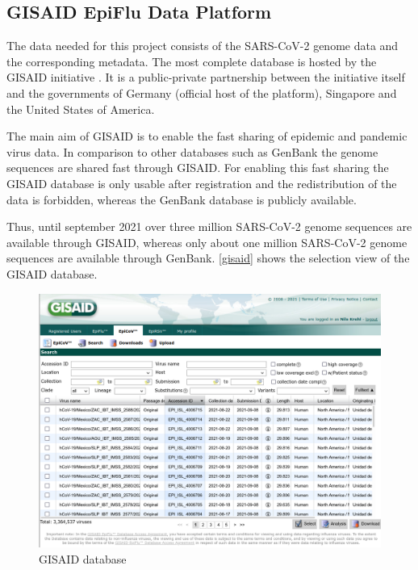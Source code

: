 \subsection{GISAID EpiFlu Data Platform} \label{fundamentalsC}

The data needed for this project consists of the \ac{SARS-CoV-2} genome data and the corresponding metadata. The most complete database is hosted by the \ac{GISAID} initiative \cite{Gisaid2021}. It is a public-private partnership between the initiative itself and the governments of Germany (official host of the platform), Singapore and the United States of America. \cite{gisaideditorGISAID2021}

The main aim of \ac{GISAID} is to enable the fast sharing of epidemic and pandemic virus data. In comparison to other databases such as GenBank the genome sequences are shared fast through \ac{GISAID}. For enabling this fast sharing the \ac{GISAID} database is only usable after registration and the redistribution of the data is forbidden, whereas the GenBank database is publicly available. \cite{shuGISAIDGlobalInitiative2017}

Thus, until september 2021 over three million \ac{SARS-CoV-2} genome sequences are available through \ac{GISAID}, whereas only about one million \ac{SARS-CoV-2} genome sequences are available through GenBank. \autoref{gisaid} shows the selection view of the \ac{GISAID} database. \cite{gisaideditorGISAID2021, nationallibraryofmedicinencbieditorNCBISARSCoV2Resources}

\begin{figure}[ht]
	\centering
	\includegraphics[width=0.9\linewidth]{figures/gisaid.png}
	\caption{\ac{GISAID} database \cite{own screenshot}}
	\label{gisaid}
\end{figure}


